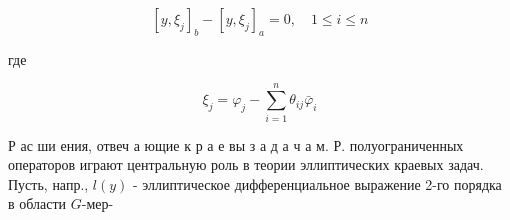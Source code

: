 \documentclass[10pt]{article}
\begin{document}
\[

\left[y, \xi_{j}\right]_{b}-\left[y, \xi_{j}\right]_{a}=0, \quad 1 \leqslant i \leqslant n

\]



где



\[

\xi_{j}=\varphi_{j}-\sum_{i=1}^{n} \theta_{i j} \bar{\varphi}_{i}

\]



Р ас ши ения, отвеч а ющие к р а е вы з а д а ч а м. Р. полуограниченных операторов играют центральную роль в теории эллиптических краевых задач. Пусть, напр., $l(y)$ - эллиптическое дифференциальное выражение 2-го порядка в области $G$-мер-
\end{document}
